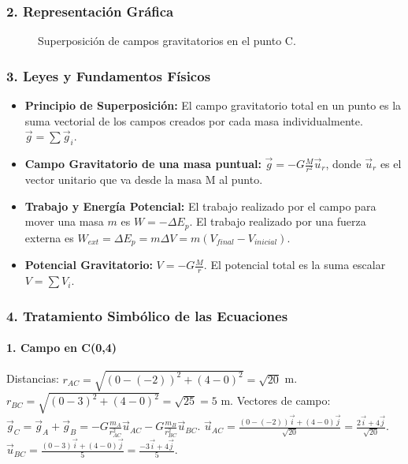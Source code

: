 \subsubsection*{2. Representación Gráfica}
\begin{figure}[H]
    \centering
    \caption{Superposición de campos gravitatorios en el punto C.}
\end{figure}

\subsubsection*{3. Leyes y Fundamentos Físicos}
\begin{itemize}
    \item \textbf{Principio de Superposición:} El campo gravitatorio total en un punto es la suma vectorial de los campos creados por cada masa individualmente. $\vec{g} = \sum \vec{g}_i$.
    \item \textbf{Campo Gravitatorio de una masa puntual:} $\vec{g} = -G \frac{M}{r^2} \vec{u}_r$, donde $\vec{u}_r$ es el vector unitario que va desde la masa M al punto.
    \item \textbf{Trabajo y Energía Potencial:} El trabajo realizado por el campo para mover una masa $m$ es $W = -\Delta E_p$. El trabajo realizado por una fuerza externa es $W_{ext} = \Delta E_p = m \Delta V = m(V_{final} - V_{inicial})$.
    \item \textbf{Potencial Gravitatorio:} $V = -G \frac{M}{r}$. El potencial total es la suma escalar $V = \sum V_i$.
\end{itemize}

\subsubsection*{4. Tratamiento Simbólico de las Ecuaciones}
\paragraph{1. Campo en C(0,4)}
Distancias: $r_{AC} = \sqrt{(0 - (-2))^2 + (4-0)^2} = \sqrt{20}$ m. $r_{BC} = \sqrt{(0-3)^2 + (4-0)^2} = \sqrt{25} = 5$ m.
Vectores de campo: $\vec{g}_C = \vec{g}_A + \vec{g}_B = -G\frac{m_A}{r_{AC}^2}\vec{u}_{AC} - G\frac{m_B}{r_{BC}^2}\vec{u}_{BC}$.
$\vec{u}_{AC} = \frac{(0-(-2))\vec{i} + (4-0)\vec{j}}{\sqrt{20}} = \frac{2\vec{i}+4\vec{j}}{\sqrt{20}}$.
$\vec{u}_{BC} = \frac{(0-3)\vec{i} + (4-0)\vec{j}}{5} = \frac{-3\vec{i}+4\vec{j}}{5}$.
